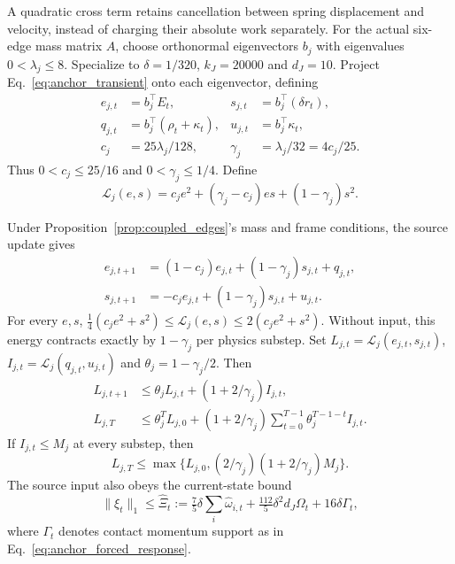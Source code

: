 A quadratic cross term retains cancellation between spring displacement and velocity, instead of charging their absolute work separately.
For the actual six-edge mass matrix $A$, choose orthonormal eigenvectors $b_j$ with eigenvalues $0<\lambda_j\le8$.
Specialize to $\delta=1/320$, $k_J=20000$ and $d_J=10$.
Project Eq.~\eqref{eq:anchor_transient} onto each eigenvector, defining
\begin{align}
 e_{j,t}&=b_j^\top E_t, & s_{j,t}&=b_j^\top(\delta r_t),\nonumber\\
 q_{j,t}&=b_j^\top(\rho_t+\kappa_t), & u_{j,t}&=b_j^\top\kappa_t,\nonumber\\
 c_j&=25\lambda_j/128, & \gamma_j&=\lambda_j/32=4c_j/25.
 \label{eq:modal_energy_coordinates}
\end{align}
Thus $0<c_j\le25/16$ and $0<\gamma_j\le1/4$.
Define
\begin{equation}
 \mathcal L_j(e,s)=c_je^2+(\gamma_j-c_j)es+(1-\gamma_j)s^2.
 \label{eq:modal_lyapunov}
\end{equation}

\begin{proposition}
\label{prop:transient_lyapunov}
Under Proposition~\ref{prop:coupled_edges}'s mass and frame conditions, the source update gives
\begin{align}
 e_{j,t+1}&=(1-c_j)e_{j,t}+(1-\gamma_j)s_{j,t}+q_{j,t},\nonumber\\
 s_{j,t+1}&=-c_je_{j,t}+(1-\gamma_j)s_{j,t}+u_{j,t}.
 \label{eq:modal_source_step}
\end{align}
For every $e,s$, $\tfrac14(c_je^2+s^2)\le\mathcal L_j(e,s)\le2(c_je^2+s^2)$.
Without input, this energy contracts exactly by $1-\gamma_j$ per physics substep.
Set $L_{j,t}=\mathcal L_j(e_{j,t},s_{j,t})$, $I_{j,t}=\mathcal L_j(q_{j,t},u_{j,t})$ and $\theta_j=1-\gamma_j/2$.
Then
\begin{align}
 L_{j,t+1}&\le\theta_jL_{j,t}+(1+2/\gamma_j)I_{j,t},\nonumber\\
 L_{j,T}&\le\theta_j^TL_{j,0}+(1+2/\gamma_j)
   \sum_{t=0}^{T-1}\theta_j^{T-1-t}I_{j,t}.
 \label{eq:modal_energy_prefix}
\end{align}
If $I_{j,t}\le M_j$ at every substep, then
\begin{equation}
 L_{j,T}\le\max\{L_{j,0},(2/\gamma_j)(1+2/\gamma_j)M_j\}.
 \label{eq:modal_uniform_input_bound}
\end{equation}
The source input also obeys the current-state bound
\begin{equation}
 \|\xi_t\|_1\le\widehat\Xi_t:=\tfrac75\delta\sum_i\widehat\omega_{i,t}
   +\tfrac{112}5\delta^2d_J\Omega_t+16\delta\Gamma_t,
 \label{eq:modal_current_input_bound}
\end{equation}
where $\Gamma_t$ denotes contact momentum support as in Eq.~\eqref{eq:anchor_forced_response}.
\end{proposition}


